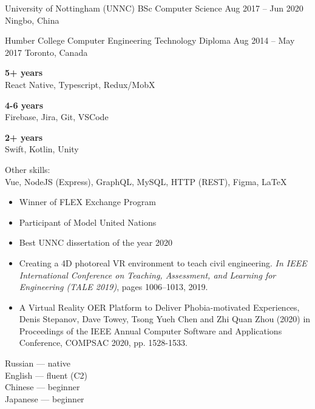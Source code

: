 \cvevent
  {University of Nottingham (UNNC)}
  {BSc Computer Science}
  {Aug 2017 -- Jun 2020}
  {Ningbo, China}
\divider

\cvevent
  {Humber College}
  {Computer Engineering Technology Diploma}
  {Aug 2014 -- May 2017}
  {Toronto, Canada}

\textbf{5+ years}
\\
React Native, Typescript, Redux/MobX

\vspace{0.2cm}
\textbf{4-6 years}
\\
Firebase, Jira, Git, VSCode

\vspace{0.2cm}
\textbf{2+ years}
\\
Swift, Kotlin, Unity

\vspace{0.5cm}
Other skills: \\
Vue, NodeJS (Express), GraphQL, MySQL, HTTP (REST), Figma, \LaTeX

\begin{itemize}
\item Winner of FLEX Exchange Program
\item Participant of Model United Nations
\item Best UNNC dissertation of the year 2020
\end{itemize}

\begin{itemize}
    \item Creating a 4D photoreal VR environment to teach civil engineering. \textit{In IEEE International Conference on Teaching, Assessment, and Learning for Engineering (TALE 2019)}, pages 1006--1013, 2019.
    \item A Virtual Reality OER Platform to Deliver Phobia-motivated Experiences, Denis Stepanov, Dave Towey, Tsong Yueh Chen and Zhi Quan Zhou (2020) in Proceedings of the IEEE Annual Computer Software and Applications Conference, COMPSAC 2020, pp. 1528-1533.
\end{itemize}

Russian --- native\\
English --- fluent (C2)\\
Chinese --- beginner\\
Japanese --- beginner
